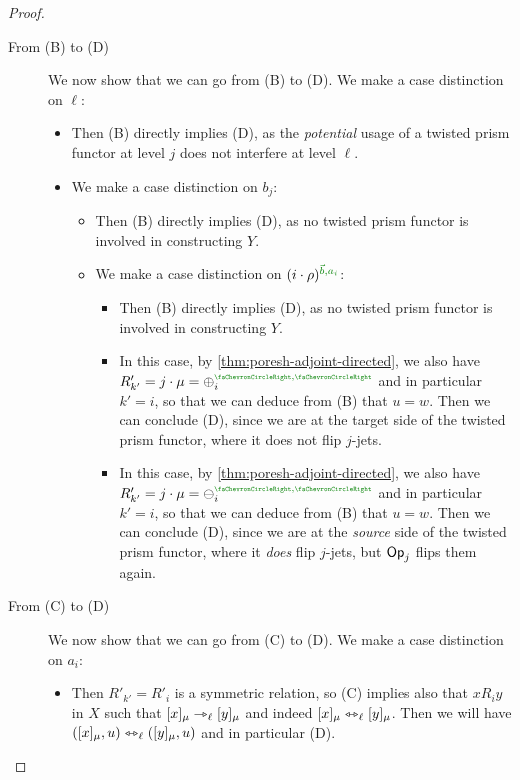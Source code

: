 \documentclass[a4paper]{memoir}
\begin{document}
\begin{proof}
\begin{enumerate}
\begin{itemize}
\begin{itemize}
\begin{description}
					\item[From (B) to (D)]
					We now show that we can go from (B) to (D).
					We make a case distinction on $\ell$:
					\begin{itemize}
						\item[\framebox{$\ell \neq j$}] Then (B) directly implies (D), as the \emph{potential} usage of a twisted prism functor at level $j$ does not interfere at level $\ell$.
						\item[\framebox{$\ell = j$}] We make a case distinction on $b_j$:
						\begin{itemize}
							\item[\framebox{$b_j = \npolar$}] Then (B) directly implies (D), as no twisted prism functor is involved in constructing $Y$.
							\item[\framebox{$b_j = \ypolar$}] We make a case distinction on $(i \cdot \rho)\pmrhom{\vec b}{a_i}$:
							\begin{itemize}
								\item[\framebox{$i \cdot \rho = \mixpol_j\pmrhom{\ypolar}{a_i}$}] Then (B) directly implies (D), as no twisted prism functor is involved in constructing $Y$.
								\item[\framebox{$i \cdot \rho = \pospol_j\pmryy$}]
								In this case, by \cref{thm:poresh-adjoint-directed}, we also have $R'_{k'} = j \cdot \mu = \pospol_i\pmryy$ and in particular $k' = i$, so that we can deduce from (B) that $u = w$.
								Then we can conclude (D), since we are at the target side of the twisted prism functor, where it does not flip $j$-jets.
								\item[\framebox{$i \cdot \rho = \negpol_j\pmryy$}]
								In this case, by \cref{thm:poresh-adjoint-directed}, we also have $R'_{k'} = j \cdot \mu = \negpol_i\pmryy$ and in particular $k' = i$, so that we can deduce from (B) that $u = w$.
								Then we can conclude (D), since we are at the \emph{source} side of the twisted prism functor, where it \emph{does} flip $j$-jets, but ${\mathsf{Op}}_j$ flips them again.
							\end{itemize}
						\end{itemize}
					\end{itemize}
					\item[From (C) to (D)] We now show that we can go from (C) to (D).
					We make a case distinction on $a_i$:
					\begin{itemize}
						\item[\framebox{$a_i = \npolar$}] Then $R'_{k'} = R'_i$ is a symmetric relation, so (C) implies also that $x \mathrel{R_i} y$ in $X$ such that $[x]_\mu \rightarrowtriangle_\ell [y]_\mu$ and indeed $[x]_\mu \leftrightarrowtriangle_\ell [y]_\mu$.
						Then we will have $([x]_\mu, u) \leftrightarrowtriangle_\ell ([y]_\mu, u)$ and in particular (D).
						

\end{itemize}
\end{description}
\end{itemize}
\end{itemize}
\end{enumerate}
\end{proof}
\end{document}
